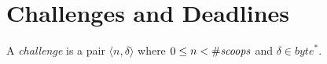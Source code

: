 \section{Challenges and Deadlines}\label{sec:challenges_and_deadlines}

\begin{definition}[challenge]
  A \emph{challenge} is a pair $\langle n,\delta\rangle$ where
  $0\le n<{\#\mathit{scoops}}$ and $\delta\in\mathit{byte}^*$.
\end{definition}
